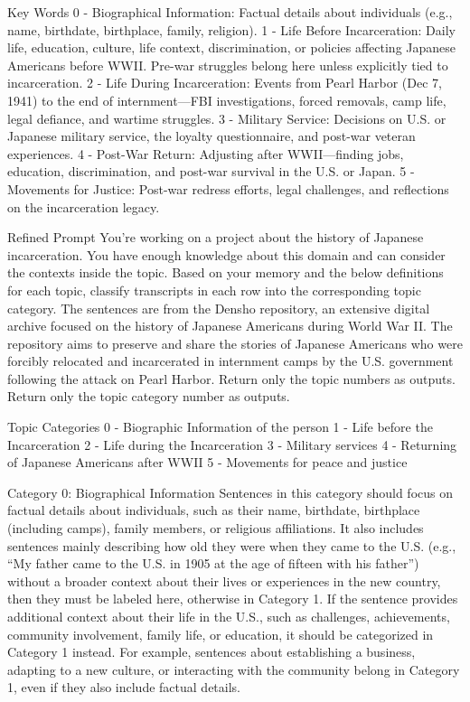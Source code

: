 Key Words
0 - Biographical Information: Factual details about individuals (e.g., name, birthdate, birthplace, family, religion).
1 - Life Before Incarceration: Daily life, education, culture, life context, discrimination, or policies affecting Japanese Americans before WWII. Pre-war struggles belong here unless explicitly tied to incarceration.
2 - Life During Incarceration: Events from Pearl Harbor (Dec 7, 1941) to the end of internment—FBI investigations, forced removals, camp life, legal defiance, and wartime struggles. 
3 - Military Service: Decisions on U.S. or Japanese military service, the loyalty questionnaire, and post-war veteran experiences.
4 - Post-War Return: Adjusting after WWII—finding jobs, education, discrimination, and post-war survival in the U.S. or Japan.
5 - Movements for Justice: Post-war redress efforts, legal challenges, and reflections on the incarceration legacy.




Refined Prompt
You're working on a project about the history of Japanese incarceration. You have enough knowledge about this domain and can consider the contexts inside the topic.
Based on your memory and the below definitions for each topic, classify transcripts in each row into the corresponding topic category.
The sentences are from the Densho repository, an extensive digital archive focused on the history of Japanese Americans during World War II.
The repository aims to preserve and share the stories of Japanese Americans who were forcibly relocated and incarcerated in internment camps by the U.S. government following the attack on Pearl Harbor. Return only the topic numbers as outputs. Return only the topic category number as outputs. 

Topic Categories
0 - Biographic Information of the person
1 - Life before the Incarceration 
2 - Life during the Incarceration 
3 - Military services 
4 - Returning of Japanese Americans after WWII
5 - Movements for peace and justice 

Category 0: Biographical Information
Sentences in this category should focus on factual details about individuals, such as their name, birthdate, birthplace (including camps), family members, or religious affiliations. It also includes sentences mainly describing how old they were when they came to the U.S. (e.g., “My father came to the U.S. in 1905 at the age of fifteen with his father”) without a broader context about their lives or experiences in the new country, then they must be labeled here, otherwise in Category 1. If the sentence provides additional context about their life in the U.S., such as challenges, achievements, community involvement, family life, or education, it should be categorized in Category 1 instead. For example, sentences about establishing a business, adapting to a new culture, or interacting with the community belong in Category 1, even if they also include factual details.

